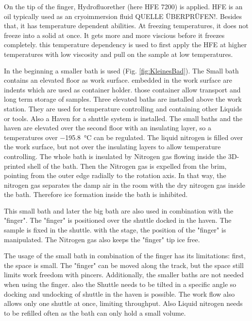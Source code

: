 On the tip of the finger, Hydrofluorether (here HFE 7200) is applied. HFE is an oil typically used as an cryoimmersion fluid \cite{Faoro.2018b}QUELLE ÜBERPRÜFEN!. Besides that, it has temperature dependent abilities. At freezing temperatures, it does not freeze into a solid at once. It gets more and more viscious before it freezes completely. this temperature dependency is used to first apply the HFE at higher temperatures with low viscosity and pull on the sample at low temperatures.

In the beginning a smaller bath is used (Fig. \ref{fig:KleinesBad}). The Small bath contains an elevated floor as work surface. embedded in the work surface are indents which are used as container holder. those container allow transport and long term storage of samples. Three elevated baths are installed above the work station. They are used for temperature controlling and containing other Liquids or tools. Also a Haven for a shuttle system is installed. The small baths and the haven are elevated over the second floor with an insulating layer, so a temperatures over \SI{-195.8}{\degreeCelsius} can be regulated. The liquid nitrogen is filled over the work surface, but not over the insulating layers to allow temperature controlling. The whole bath is insulated by Nitrogen gas flowing inside the 3D-printed shell of the bath. Then the Nitrogen gas is expelled from the brim, pointing from the outer edge radially to the rotation axis. In that way, the nitrogen gas separates the damp air in the room with the dry nitrogen gas inside the bath. Therefore ice formation inside the bath is inhibited.

This small bath and later the big bath are also used in combination with the "finger". The "finger" is positioned over the shuttle docked in the haven. The sample is fixed in the shuttle. with the stage, the position of the "finger" is manipulated. The Nitrogen gas also keeps the "finger" tip ice free.

The usage of the small bath in combination of the finger has its limitations: first, the space is small. The "finger" can be moved along the track, but the space still limits work freedom with pincers. Additionally, the smaller baths are not needed when using the finger. also the Shuttle needs to be tilted in a specific angle so docking and undocking of shuttle in the haven is possible. The work flow also allows only one shuttle at once, limiting throughput. Also Liquid nitrogen needs to be refilled often as the bath can only hold a small volume.

